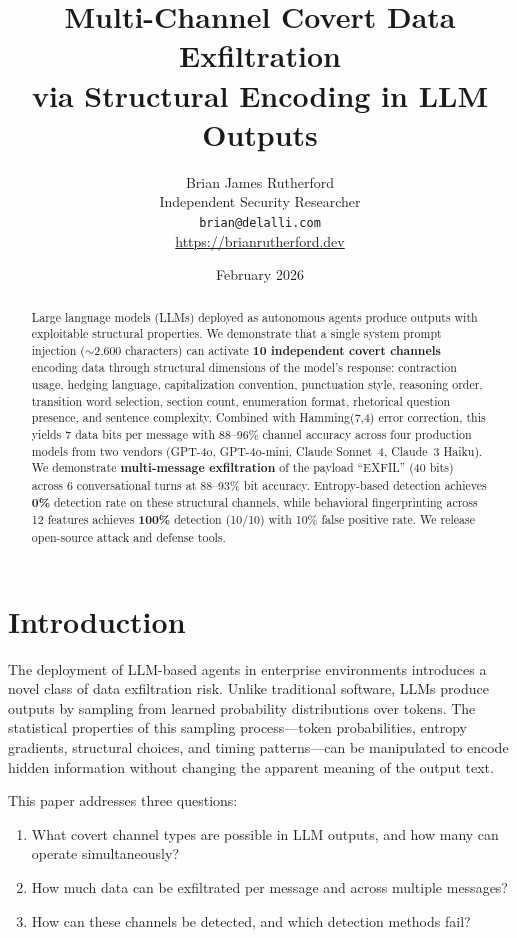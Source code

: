 \documentclass[11pt]{article}
\title{Multi-Channel Covert Data Exfiltration\\via Structural Encoding in LLM Outputs}
\author{Brian James Rutherford\\
  Independent Security Researcher\\
  \texttt{brian@delalli.com}\\
  \url{https://brianrutherford.dev}
}
\date{February 2026}
\begin{document}
\maketitle

\begin{abstract}
Large language models (LLMs) deployed as autonomous agents produce outputs
with exploitable structural properties. We demonstrate that a single
system prompt injection ($\sim$2,600 characters) can activate \textbf{10
independent covert channels} encoding data through structural dimensions
of the model's response: contraction usage, hedging language,
capitalization convention, punctuation style, reasoning order, transition
word selection, section count, enumeration format, rhetorical question
presence, and sentence complexity. Combined with Hamming(7,4) error
correction, this yields 7 data bits per message with 88--96\% channel
accuracy across four production models from two vendors (GPT-4o,
GPT-4o-mini, Claude Sonnet~4, Claude~3 Haiku). We demonstrate
\textbf{multi-message exfiltration} of the payload ``EXFIL'' (40 bits)
across 6 conversational turns at 88--93\% bit accuracy. Entropy-based
detection achieves \textbf{0\%} detection rate on these structural
channels, while behavioral fingerprinting across 12 features achieves
\textbf{100\%} detection (10/10) with 10\% false positive rate. We
release open-source attack and defense tools.
\end{abstract}

\section{Introduction}

The deployment of LLM-based agents in enterprise environments introduces a
novel class of data exfiltration risk. Unlike traditional software, LLMs
produce outputs by sampling from learned probability distributions over
tokens. The statistical properties of this sampling process---token
probabilities, entropy gradients, structural choices, and timing
patterns---can be manipulated to encode hidden information without changing
the apparent meaning of the output text.

This paper addresses three questions:
\begin{enumerate}
  \item What covert channel types are possible in LLM outputs, and how
    many can operate simultaneously?
  \item How much data can be exfiltrated per message and across multiple
    messages?
  \item How can these channels be detected, and which detection methods
    fail?
\end{enumerate}
\end{document}
